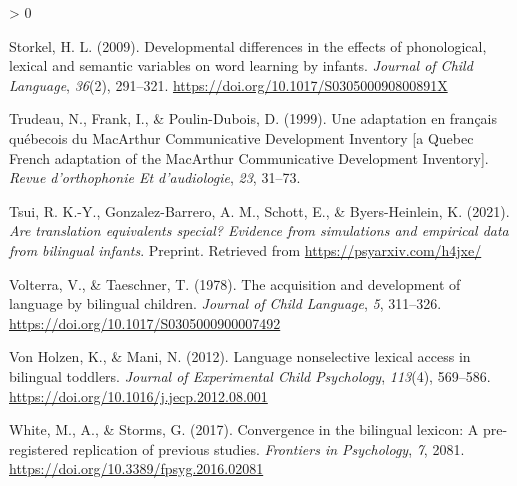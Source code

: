 \documentclass[
  english,
  ,man,floatsintext]{apa6}
\newlength{\cslhangindent}
\newenvironment{CSLReferences}[2] %
 {%
  \setlength{\parindent}{0pt}
  \ifodd #1 \everypar{\setlength{\hangindent}{\cslhangindent}}\ignorespaces\fi
  \ifnum #2 > 0
  \setlength{\parskip}{#2\baselineskip}
  \fi
 }%
 {}
\begin{document}
\begin{CSLReferences}{1}{0}
\leavevmode\hypertarget{ref-Storkel_2009}{}%
Storkel, H. L. (2009). Developmental differences in the effects of phonological, lexical and semantic variables on word learning by infants. \emph{Journal of Child Language}, \emph{36}(2), 291--321. \url{https://doi.org/10.1017/S030500090800891X}

\leavevmode\hypertarget{ref-Trudeau_etal_1999}{}%
Trudeau, N., Frank, I., \& Poulin-Dubois, D. (1999). Une adaptation en français québecois du MacArthur {C}ommunicative {D}evelopment {I}nventory {[}a {Q}uebec {F}rench adaptation of the MacArthur {C}ommunicative {D}evelopment {I}nventory{]}. \emph{Revue d'orthophonie Et d'audiologie}, \emph{23}, 31--73.

\leavevmode\hypertarget{ref-Tsui_etal_2021}{}%
Tsui, R. K.-Y., Gonzalez-Barrero, A. M., Schott, E., \& Byers-Heinlein, K. (2021). \emph{Are translation equivalents special? Evidence from simulations and empirical data from bilingual infants}. Preprint. Retrieved from \url{https://psyarxiv.com/h4jxe/}

\leavevmode\hypertarget{ref-Volterra_Taeschner_1978}{}%
Volterra, V., \& Taeschner, T. (1978). The acquisition and development of language by bilingual children. \emph{Journal of Child Language}, \emph{5}, 311--326. \url{https://doi.org/10.1017/S0305000900007492}

\leavevmode\hypertarget{ref-VonHolzen_Mani_2012}{}%
Von Holzen, K., \& Mani, N. (2012). Language nonselective lexical access in bilingual toddlers. \emph{Journal of Experimental Child Psychology}, \emph{113}(4), 569--586. \url{https://doi.org/10.1016/j.jecp.2012.08.001}

\leavevmode\hypertarget{ref-White_etal_2017}{}%
White, M., A., \& Storms, G. (2017). Convergence in the bilingual lexicon: A pre-registered replication of previous studies. \emph{Frontiers in Psychology}, \emph{7}, 2081. \url{https://doi.org/10.3389/fpsyg.2016.02081}

\end{CSLReferences}

\endgroup
\end{document}
